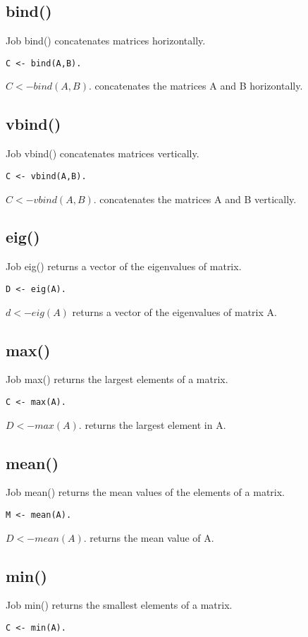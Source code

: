 \documentclass[prodmode,acmtecs]{acmsmall}
\begin{document}
\subsection{bind()}
Job bind() concatenates matrices horizontally.
\begin{lstlisting}
C <- bind(A,B).
\end{lstlisting}

$C <- bind(A,B).$ concatenates the matrices A and B horizontally.
\medskip

\subsection{vbind()}
Job vbind() concatenates matrices vertically.
\begin{lstlisting}
C <- vbind(A,B).
\end{lstlisting}

$C <- vbind(A,B).$ concatenates the matrices A and B vertically.
\medskip

\subsection{eig()}
Job eig() returns a vector of the eigenvalues of matrix.
\begin{lstlisting}
D <- eig(A).
\end{lstlisting}

$d <- eig(A)$ returns a vector of the eigenvalues of matrix A.
\medskip

\subsection{max()}
Job max() returns the largest elements of a matrix.
\begin{lstlisting}
C <- max(A).
\end{lstlisting}

$D <- max(A).$ returns the largest element in A.
\medskip

\subsection{mean()}
Job mean() returns the mean values of the elements of a matrix.
\begin{lstlisting}
M <- mean(A).
\end{lstlisting}

$D <- mean(A).$ returns the mean value of A.
\medskip

\subsection{min()}
Job min() returns the smallest elements of a matrix.
\begin{lstlisting}
C <- min(A).
\end{lstlisting}
\end{document}
